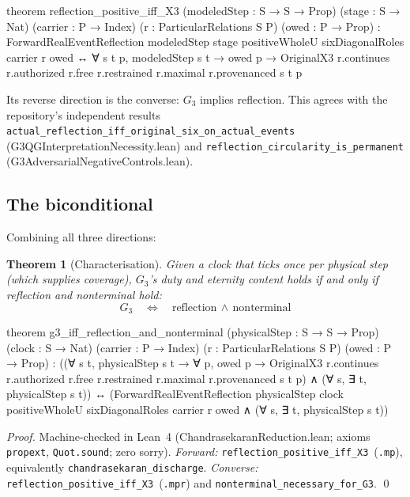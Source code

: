 \documentclass[11pt,a4paper]{article}
\newtheorem{theorem}{Theorem}[section]
\theoremstyle{definition}
\theoremstyle{remark}
\begin{document}
\begin{leancode}
theorem reflection_positive_iff_X3
    (modeledStep : S → S → Prop) (stage : S → Nat)
    (carrier : P → Index) (r : ParticularRelations S P) (owed : P → Prop) :
    ForwardRealEventReflection modeledStep stage positiveWholeU
        sixDiagonalRoles carrier r owed ↔
      ∀ s t p, modeledStep s t → owed p →
        OriginalX3 r.continues r.authorized r.free r.restrained
          r.maximal r.provenanced s t p
\end{leancode}

Its reverse direction is the converse: $G_3$ implies reflection. This agrees with the repository's independent results \texttt{actual\_reflection\_iff\_original\_six\_on\_actual\_events} (G3QGInterpretationNecessity.lean) and \texttt{reflection\_circularity\_is\_permanent} (G3AdversarialNegativeControls.lean).

\subsection{The biconditional}\label{sec:iff}

Combining all three directions:

\begin{theorem}[Characterisation]\label{thm:iff}
Given a clock that ticks once per physical step (which supplies coverage), $G_3$'s duty and eternity content holds if and only if reflection and nonterminal hold:
\[
G_3 \quad\Longleftrightarrow\quad \text{reflection} \,\wedge\, \text{nonterminal}
\]
\end{theorem}

\begin{leancode}
theorem g3_iff_reflection_and_nonterminal
    (physicalStep : S → S → Prop) (clock : S → Nat)
    (carrier : P → Index) (r : ParticularRelations S P) (owed : P → Prop) :
    ((∀ s t, physicalStep s t → ∀ p, owed p →
        OriginalX3 r.continues r.authorized r.free r.restrained
          r.maximal r.provenanced s t p) ∧
      (∀ s, ∃ t, physicalStep s t)) ↔
    (ForwardRealEventReflection physicalStep clock positiveWholeU
        sixDiagonalRoles carrier r owed ∧
      (∀ s, ∃ t, physicalStep s t))
\end{leancode}

\begin{proof}
Machine-checked in Lean~4 (ChandrasekaranReduction.lean; axioms \texttt{propext}, \texttt{Quot.sound}; zero sorry). \emph{Forward:} \texttt{reflection\_positive\_iff\_X3}~(\texttt{.mp}), equivalently \texttt{chandrasekaran\_discharge}. \emph{Converse:} \texttt{reflection\_positive\_iff\_X3}~(\texttt{.mpr}) and \texttt{nonterminal\_necessary\_for\_G3}. \qed
\end{proof}
\end{document}
